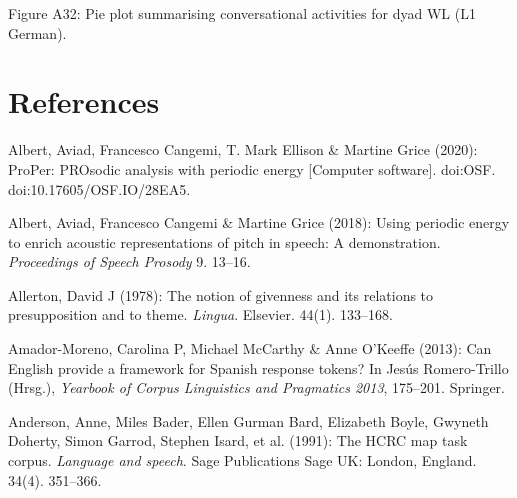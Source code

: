 \begin{stylecaption}
  [Warning: Image ignored] %
 
\end{stylecaption}

\begin{stylecaption}
Figure A32: Pie plot summarising conversational activities for dyad WL (L1 German).
\end{stylecaption}

\clearpage\section{References}
\hypertarget{Toc191305968}{}\begin{styleBibliography}
Albert, Aviad, Francesco Cangemi, T. Mark Ellison \& Martine Grice (2020): ProPer: PROsodic analysis with periodic energy [Computer software]. doi:OSF. doi:10.17605/OSF.IO/28EA5.
\end{styleBibliography}

\begin{styleBibliography}
Albert, Aviad, Francesco Cangemi \& Martine Grice (2018): Using periodic energy to enrich acoustic representations of pitch in speech: A demonstration. \textit{Proceedings of Speech Prosody} 9. 13–16.
\end{styleBibliography}

\begin{styleBibliography}
Allerton, David J (1978): The notion of givenness and its relations to presupposition and to theme. \textit{Lingua}. Elsevier. 44(1). 133–168.
\end{styleBibliography}

\begin{styleBibliography}
Amador-Moreno, Carolina P, Michael McCarthy \& Anne O’Keeffe (2013): Can English provide a framework for Spanish response tokens? In Jesús Romero-Trillo (Hrsg.), \textit{Yearbook of Corpus Linguistics and Pragmatics 2013}, 175–201. Springer.
\end{styleBibliography}

\begin{styleBibliography}
Anderson, Anne, Miles Bader, Ellen Gurman Bard, Elizabeth Boyle, Gwyneth Doherty, Simon Garrod, Stephen Isard, et al. (1991): The HCRC map task corpus. \textit{Language and speech}. Sage Publications Sage UK: London, England. 34(4). 351–366.
\end{styleBibliography}

